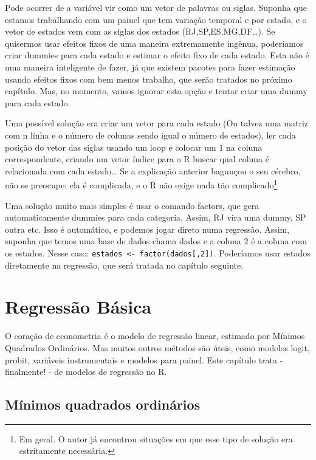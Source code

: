 \documentclass[]{book}
\let\rmarkdownfootnote\footnote%
\def\footnote{\protect\rmarkdownfootnote}
\begin{document}
Pode ocorrer de a variável vir como um vetor de palavras ou siglas.
Suponha que estamos trabalhando com um painel que tem variação temporal
e por estado, e o vetor de estados vem com as siglas dos estados
(RJ,SP,ES,MG,DF\ldots{}). Se quisermos usar efeitos fixos de uma maneira
extremamente ingênua, poderíamos criar dummies para cada estado e
estimar o efeito fixo de cada estado. Esta não é uma maneira inteligente
de fazer, já que existem pacotes para fazer estimação usando efeitos
fixos com bem menos trabalho, que serão tratados no próximo capítulo.
Mas, no momento, vamos ignorar esta opção e tentar criar uma dummy para
cada estado.

Uma possível solução era criar um vetor para cada estado (Ou talvez uma
matriz com n linha e o número de colunas sendo igual o número de
estados), ler cada posição do vetor das siglas usando um loop e colocar
um 1 na coluna correspondente, criando um vetor índice para o R buscar
qual coluna é relacionada com cada estado\ldots{} Se a explicação
anterior bagunçou o seu cérebro, não se preocupe: ela é complicada, e o
R não exige nada tão complicado\footnote{Em geral. O autor já encontrou
  situações em que esse tipo de solução era estritamente necessária.}

Uma solução muito mais simples é usar o comando factors, que gera
automaticamente dummies para cada categoria. Assim, RJ vira uma dummy,
SP outra etc. Isso é automático, e podemos jogar direto numa regressão.
Assim, suponha que temos uma base de dados chama dados e a coluna 2 é a
coluna com os estados. Nesse caso:
\texttt{estados\ \textless{}-\ factor(dados{[},2{]})}. Poderíamos usar
estados diretamente na regressão, que será tratada no capítulo seguinte.

\chapter{Regressão Básica}\label{regressao-basica}

O coração de econometria é o modelo de regressão linear, estimado por
Mínimos Quadrados Ordinários. Mas muitos outros métodos são úteis, como
modelos logit, probit, variáveis instrumentais e modelos para painel.
Este capítulo trata - finalmente! - de modelos de regressão no R.

\section{Mínimos quadrados
ordinários}\label{minimos-quadrados-ordinarios}
\end{document}
